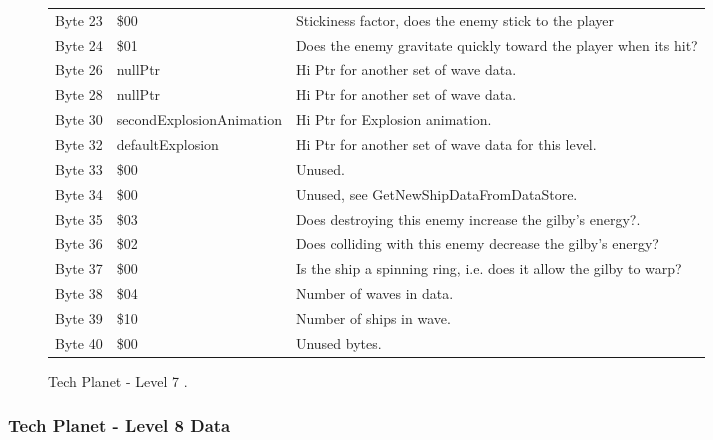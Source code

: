\begin{figure}[H]
{\begin{adjustbox}{width=12cm}
\begin{tabular}{lll}
 Byte 23 & \$00                       & Stickiness factor, does the enemy stick to the player              \\
 Byte 24 & \$01                       & Does the enemy gravitate quickly toward the player when its hit?   \\
 Byte 26 & nullPtr                   & Hi Ptr for another set of wave data.                               \\
 Byte 28 & nullPtr                   & Hi Ptr for another set of wave data.                               \\
 Byte 30 & secondExplosionAnimation  & Hi Ptr for Explosion animation.                                    \\
 Byte 32 & defaultExplosion          & Hi Ptr for another set of wave data for this level.                \\
 Byte 33 & \$00                       & Unused.                                                            \\
 Byte 34 & \$00                       & Unused, see GetNewShipDataFromDataStore.                           \\
 Byte 35 & \$03                       & Does destroying this enemy increase the gilby's energy?.           \\
 Byte 36 & \$02                       & Does colliding with this enemy decrease the gilby's energy?        \\
 Byte 37 & \$00                       & Is the ship a spinning ring, i.e. does it allow the gilby to warp? \\
 Byte 38 & \$04                       & Number of waves in data.                                           \\
 Byte 39 & \$10                       & Number of ships in wave.                                           \\
 Byte 40 & \$00                       & Unused bytes.                                                      \\
\bottomrule
\end{tabular}

  \end{adjustbox}

  }\caption*{Tech Planet - Level 7
.}
\end{figure}

\clearpage
\subsubsection{Tech Planet - Level 8 Data}

